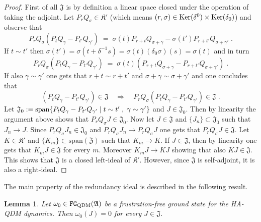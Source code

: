 \documentclass[a4paper,12pt,twoside,reqno]{amsart}
\theoremstyle{plain}
\newtheorem{lemma}[teo]{Lemma}
\theoremstyle{definition}
\theoremstyle{remark}
\numberwithin{equation}{section}
\numberwithin{figure}{section}
\numberwithin{table}{section}
\newcommand{\pa}[1]{\left( #1 \right)}
\begin{document}
	
	
	\begin{proof}
		First of all $\mathfrak{J}$ is by definition a linear space 
		closed under the operation of taking the adjoint. Let $P_{r}Q_{\sigma}\in \mathfrak{K}'$ (which means $(r,\sigma)\in{\rm Ker}(\delta^0)\times {\rm Ker}(\delta_0)$) 
		and observe that 
		\begin{equation*}
			P_rQ_{\sigma}\pa{P_tQ_\gamma-P_{t'}Q_{\gamma'}}\;=\;\sigma(t)P_{r+t}Q_{\sigma+\gamma}-\sigma(t')P_{r+t'}Q_{\sigma+\gamma'}\;.
		\end{equation*}
		If $t\sim t'$ then $\sigma(t')=\sigma(t+\delta^{-1}s)=\sigma(t)(\delta_0\sigma)(s)=\sigma(t)$ and in turn 
		\begin{equation*}
			P_rQ_{\sigma}\pa{P_tQ_\gamma-P_{t'}Q_{\gamma'}}\;=\;\sigma(t)(P_{r+t}Q_{\sigma+\gamma}-P_{r+t'}Q_{\sigma+\gamma'})\;.
		\end{equation*}
		If also $\gamma\sim \gamma'$ one gets that $r+t\sim r+t'$ and $\sigma+\gamma\sim
		\sigma+\gamma'$ and one concludes that
		\begin{equation*}
			\pa{P_tQ_\gamma-P_{t'}Q_{\gamma'}}\in \mathfrak{J}\quad \Rightarrow\quad
			P_rQ_{\sigma}\pa{P_tQ_\gamma-P_{t'}Q_{\gamma'}}\in \mathfrak{J}\;.
		\end{equation*}
		Let $\mathfrak{J}_0:={{\rm span}\{P_tQ_\gamma-P_{t'}Q_{\gamma'}\;|\; t\sim t'\;,\;\gamma\sim \gamma'\}}$ and $J\in \mathfrak{J}_0$.
		Then by linearity the argument above shows that $P_rQ_{\sigma}J\in \mathfrak{J}_0$. Now let $J\in \mathfrak{J}$ and $\{J_n\}\subset\mathfrak{J}_0$ such that $J_n\to J$. Since $P_rQ_{\sigma}J_n\in \mathfrak{J}_0$ and $P_rQ_{\sigma}J_n\to P_rQ_{\sigma}J$ one gets that 
		$P_rQ_{\sigma}J\in \mathfrak{J}$. Let $K\in\mathfrak{K}'$ and $\{K_m\}\subset \mathrm{span}(\mathfrak{Z})$ such that $K_m\to K$. If $J\in \mathfrak{J}$, then by linearity one gets that $K_m J\in \mathfrak{J}$ for every $m$. Moreover $K_m J\to KJ$ showing that also $KJ \in \mathfrak{J}$. This shows that $\mathfrak{J}$ is a closed left-ideal of $\mathfrak{K}'$. However, since $\mathfrak{J}$ is self-adjoint, it is also a right-ideal.
	\end{proof}
	
	
	
	\medskip
	
	
	
	
	The main property of the redundancy ideal is described in the following result.
	
	
	
	
	\begin{lemma}\label{lemma:ker_J}
		Let $\omega_0\in \mathtt{FG}_{\rm QDM}(\mathfrak{A})$ be a 
		frustration-free ground state for  the {HA-QDM dynamics}. Then 
		$\omega_0(J)=0$ for every $J\in \mathfrak{J}$.
	\end{lemma}
	
\end{document}
